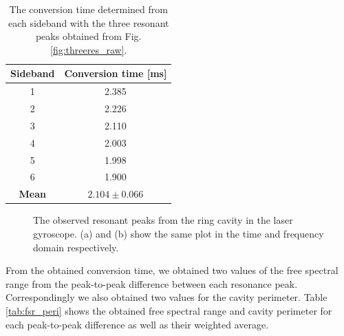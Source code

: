 \documentclass[a4paper]{report}
\numberwithin{equation}{section}
\begin{document}
\begin{table}[h!]
	\centering
	\begin{tabular}{|c|c|}
		\hline 
		Sideband & Conversion time [ms] \\ \hline
		1 & 2.385 \\ \hline
		2 & 2.226 \\ \hline
		3 & 2.110 \\ \hline
		4 & 2.003 \\ \hline
		5 & 1.998 \\ \hline
		6 & 1.900 \\ \hline
		\textbf{Mean} & \textbf{$2.104 \pm 0.066$} \\ \hline
	\end{tabular}
	\caption{The conversion time determined from each sideband with the three resonant peaks obtained from Fig. \ref{fig:threeres_raw}.}
	\label{tab:mod_times}
\end{table}


\begin{figure}[h!]
	\centering
	\quad
	\centering
	\caption{The observed resonant peaks from the ring cavity in the laser gyroscope. (a) and (b) show the 
	same plot in the time and frequency domain respectively.}
	\label{fig:res_peaks}
\end{figure}

From the obtained conversion time, we obtained two values of the free spectral range from the peak-to-peak difference
between each resonance peak. Correspondingly we also obtained two values for the cavity perimeter. Table \ref{tab:fsr_peri} shows the 
obtained free spectral range and cavity perimeter for each peak-to-peak difference as well as their weighted average.
\end{document}
